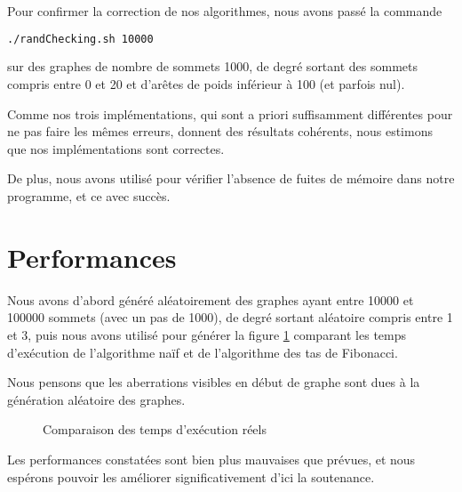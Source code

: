\documentclass[12p0t,a4paper]{article}
\begin{document}
Pour confirmer la correction de nos algorithmes, nous avons passé la commande

\begin{lstlisting}[language=bash]
./randChecking.sh 10000
\end{lstlisting}

sur des graphes de nombre de sommets 1000, de degré sortant des sommets compris entre 0 et 20 et d'arêtes de poids inférieur à 100 (et parfois nul).

Comme nos trois implémentations, qui sont a priori suffisamment différentes pour ne pas faire les mêmes erreurs, donnent des résultats cohérents, nous estimons que nos implémentations sont correctes.

De plus, nous avons utilisé  pour vérifier l'absence de fuites de mémoire dans notre programme, et ce avec succès.

\section{Performances}

Nous avons d'abord généré aléatoirement des graphes ayant entre 10000 et 100000 sommets (avec un pas de 1000), de degré sortant aléatoire compris entre 1 et 3, puis nous avons utilisé  pour générer la figure \ref{fig:graph} comparant les temps d'exécution de l'algorithme naïf et de l'algorithme des tas de Fibonacci.

Nous pensons que les aberrations visibles en début de graphe sont dues à la génération aléatoire des graphes.

\begin{figure}[h!]
  \begin{center}
    \caption{Comparaison des temps d'exécution réels}
    \label{fig:graph}
  \end{center}
\end{figure}

Les performances constatées sont bien plus mauvaises que prévues, et nous espérons pouvoir les améliorer significativement d'ici la soutenance.
\end{document}
